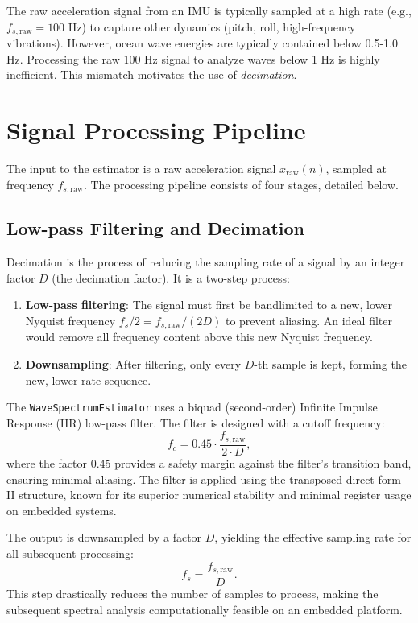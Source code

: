 \documentclass[11pt]{article}
\begin{document}
The raw acceleration signal from an IMU is typically sampled at a high rate (e.g., $f_{s,\text{raw}} = 100$ Hz) to capture other dynamics (pitch, roll, high-frequency vibrations). However, ocean wave energies are typically contained below 0.5-1.0 Hz. Processing the raw 100 Hz signal to analyze waves below 1 Hz is highly inefficient. This mismatch motivates the use of \textit{decimation}.

\section{Signal Processing Pipeline}
\label{sec:pipeline}
The input to the estimator is a raw acceleration signal $x_{\text{raw}}(n)$, sampled at frequency $f_{s,\text{raw}}$. The processing pipeline consists of four stages, detailed below.

\subsection{Low-pass Filtering and Decimation}
\label{subsec:decimation}
Decimation is the process of reducing the sampling rate of a signal by an integer factor $D$ (the decimation factor). It is a two-step process:
\begin{enumerate}
    \item \textbf{Low-pass filtering}: The signal must first be bandlimited to a new, lower Nyquist frequency $f_s/2 = f_{s,\text{raw}}/(2D)$ to prevent aliasing. An ideal filter would remove all frequency content above this new Nyquist frequency.
    \item \textbf{Downsampling}: After filtering, only every $D$-th sample is kept, forming the new, lower-rate sequence.
\end{enumerate}

The \texttt{WaveSpectrumEstimator} uses a biquad (second-order) Infinite Impulse Response (IIR) low-pass filter. The filter is designed with a cutoff frequency:
\begin{equation}
f_c = 0.45 \cdot \frac{f_{s,\text{raw}}}{2 \cdot D},
\end{equation}
where the factor 0.45 provides a safety margin against the filter's transition band, ensuring minimal aliasing. The filter is applied using the transposed direct form II structure, known for its superior numerical stability and minimal register usage on embedded systems.

The output is downsampled by a factor $D$, yielding the effective sampling rate for all subsequent processing:
\begin{equation}
f_s = \frac{f_{s,\text{raw}}}{D}.
\end{equation}
This step drastically reduces the number of samples to process, making the subsequent spectral analysis computationally feasible on an embedded platform.
\end{document}
